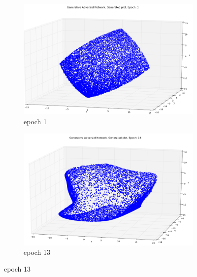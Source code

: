 \begin{figure}
\centering

\begin{subfigure}[t]{.4\textwidth}
\centering
\includegraphics[width=\linewidth]{GANResults/Gen1.png}
        \caption{epoch 1}
\end{subfigure}
%
\begin{subfigure}[t]{.4\textwidth}
\centering
\includegraphics[width=\linewidth]{GANResults/Gen13.png}
\caption{epoch 13}
\end{subfigure}
\medskip


\end{figure}
